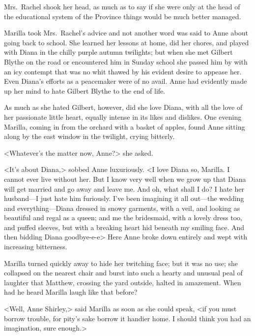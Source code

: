 Mrs.~Rachel shook her head, as much as to say if she were only at the head of the educational system of the Province things would be much better managed.

Marilla took Mrs.~Rachel's advice and not another word was said to Anne about going back to school. She learned her lessons at home, did her chores, and played with Diana in the chilly purple autumn twilights; but when she met Gilbert Blythe on the road or encountered him in Sunday school she passed him by with an icy contempt that was no whit thawed by his evident desire to appease her. Even Diana's efforts as a peacemaker were of no avail. Anne had evidently made up her mind to hate Gilbert Blythe to the end of life.

As much as she hated Gilbert, however, did she love Diana, with all the love of her passionate little heart, equally intense in its likes and dislikes. One evening Marilla, coming in from the orchard with a basket of apples, found Anne sitting along by the east window in the twilight, crying bitterly.

<Whatever's the matter now, Anne?> she asked.

<It's about Diana,> sobbed Anne luxuriously. <I love Diana so, Marilla. I cannot ever live without her. But I know very well when we grow up that Diana will get married and go away and leave me. And oh, what shall I do? I hate her husband—I just hate him furiously. I've been imagining it all out—the wedding and everything—Diana dressed in snowy garments, with a veil, and looking as beautiful and regal as a queen; and me the bridesmaid, with a lovely dress too, and puffed sleeves, but with a breaking heart hid beneath my smiling face. And then bidding Diana goodbye-e-e\longdash> Here Anne broke down entirely and wept with increasing bitterness.

Marilla turned quickly away to hide her twitching face; but it was no use; she collapsed on the nearest chair and burst into such a hearty and unusual peal of laughter that Matthew, crossing the yard outside, halted in amazement. When had he heard Marilla laugh like that before?

<Well, Anne Shirley,> said Marilla as soon as she could speak, <if you must borrow trouble, for pity's sake borrow it handier home. I should think you had an imagination, sure enough.>